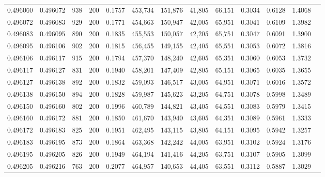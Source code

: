 \begin{tabular}{rrrrrrrrrrrrr}
0.496060 & 0.496072 &    938 & 200 &                                     0.1757 & 453,734 & 151,876 &  41,805 &  66,151 & 0.3034 & 0.6128 & 1.4068 \\
0.496072 & 0.496083 &    929 & 200 &                                     0.1771 & 454,663 & 150,947 &  42,005 &  65,951 & 0.3041 & 0.6109 & 1.3982 \\
0.496083 & 0.496095 &    890 & 200 &                                     0.1835 & 455,553 & 150,057 &  42,205 &  65,751 & 0.3047 & 0.6091 & 1.3900 \\
0.496095 & 0.496106 &    902 & 200 &                                     0.1815 & 456,455 & 149,155 &  42,405 &  65,551 & 0.3053 & 0.6072 & 1.3816 \\
0.496106 & 0.496117 &    915 & 200 &                                     0.1794 & 457,370 & 148,240 &  42,605 &  65,351 & 0.3060 & 0.6053 & 1.3732 \\
0.496117 & 0.496127 &    831 & 200 &                                     0.1940 & 458,201 & 147,409 &  42,805 &  65,151 & 0.3065 & 0.6035 & 1.3655 \\
0.496127 & 0.496138 &    892 & 200 &                                     0.1832 & 459,093 & 146,517 &  43,005 &  64,951 & 0.3071 & 0.6016 & 1.3572 \\
0.496138 & 0.496150 &    894 & 200 &                                     0.1828 & 459,987 & 145,623 &  43,205 &  64,751 & 0.3078 & 0.5998 & 1.3489 \\
0.496150 & 0.496160 &    802 & 200 &                                     0.1996 & 460,789 & 144,821 &  43,405 &  64,551 & 0.3083 & 0.5979 & 1.3415 \\
0.496160 & 0.496172 &    881 & 200 &                                     0.1850 & 461,670 & 143,940 &  43,605 &  64,351 & 0.3089 & 0.5961 & 1.3333 \\
0.496172 & 0.496183 &    825 & 200 &                                     0.1951 & 462,495 & 143,115 &  43,805 &  64,151 & 0.3095 & 0.5942 & 1.3257 \\
0.496183 & 0.496195 &    873 & 200 &                                     0.1864 & 463,368 & 142,242 &  44,005 &  63,951 & 0.3102 & 0.5924 & 1.3176 \\
0.496195 & 0.496205 &    826 & 200 &                                     0.1949 & 464,194 & 141,416 &  44,205 &  63,751 & 0.3107 & 0.5905 & 1.3099 \\
0.496205 & 0.496216 &    763 & 200 &                                     0.2077 & 464,957 & 140,653 &  44,405 &  63,551 & 0.3112 & 0.5887 & 1.3029 \\

\end{tabular}
